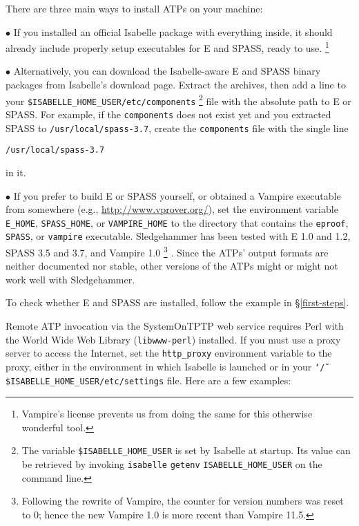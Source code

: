 \documentclass[a4paper,12pt]{article}
\begin{document}
There are three main ways to install ATPs on your machine:

\begin{enum}
\item[$\bullet$] If you installed an official Isabelle package with everything
inside, it should already include properly setup executables for E and SPASS,
ready to use.%
\footnote{Vampire's license prevents us from doing the same for this otherwise
wonderful tool.}

\item[$\bullet$] Alternatively, you can download the Isabelle-aware E and SPASS
binary packages from Isabelle's download page. Extract the archives, then add a
line to your \texttt{\$ISABELLE\_HOME\_USER/etc/components}%
\footnote{The variable \texttt{\$ISABELLE\_HOME\_USER} is set by Isabelle at
startup. Its value can be retrieved by invoking \texttt{isabelle}
\texttt{getenv} \texttt{ISABELLE\_HOME\_USER} on the command line.}
file with the absolute
path to E or SPASS. For example, if the \texttt{components} does not exist yet
and you extracted SPASS to \texttt{/usr/local/spass-3.7}, create the
\texttt{components} file with the single line

\prew
\texttt{/usr/local/spass-3.7}
\postw

in it.

\item[$\bullet$] If you prefer to build E or SPASS yourself, or obtained a
Vampire executable from somewhere (e.g., \url{http://www.vprover.org/}),
set the environment variable \texttt{E\_HOME}, \texttt{SPASS\_HOME}, or
\texttt{VAMPIRE\_HOME} to the directory that contains the \texttt{eproof},
\texttt{SPASS}, or \texttt{vampire} executable. Sledgehammer has been tested
with E 1.0 and 1.2, SPASS 3.5 and 3.7, and Vampire 1.0%
\footnote{Following the rewrite of Vampire, the counter for version numbers was
reset to 0; hence the new Vampire 1.0 is more recent than Vampire 11.5.}%
. Since the ATPs' output formats are neither documented nor stable, other
versions of the ATPs might or might not work well with Sledgehammer.
\end{enum}

To check whether E and SPASS are installed, follow the example in
\S\ref{first-steps}.

Remote ATP invocation via the SystemOnTPTP web service requires Perl with the
World Wide Web Library (\texttt{libwww-perl}) installed. If you must use a proxy
server to access the Internet, set the \texttt{http\_proxy} environment variable
to the proxy, either in the environment in which Isabelle is launched or in your
\texttt{\char`\~/\$ISABELLE\_HOME\_USER/etc/settings} file. Here are a few examples:
\end{document}
